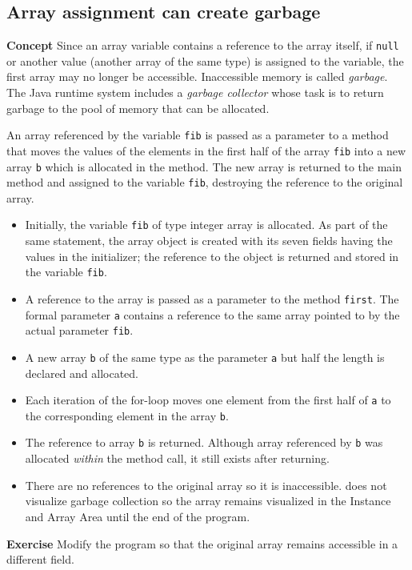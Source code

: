 \subsection{Array assignment can create garbage}\label{array.05}

\textbf{Concept} Since an array variable contains a reference to the array itself, if 
\texttt{null} or another value (another array of the same type) is assigned to the 
variable, the first array may no longer be accessible. Inaccessible memory 
is called \emph{garbage}. The Java runtime system includes a \emph{garbage 
collector} whose task is to return garbage to the pool of memory that can 
be allocated.


An array referenced by the variable \texttt{fib} is passed as a parameter to a method that moves the values of the elements in the first half of the array \texttt{fib} into a new array \texttt{b} which is allocated in the method. The new array is returned to the main method and assigned to the variable \texttt{fib}, destroying the reference to the original array.

\begin{itemize}
\item Initially, the variable \texttt{fib} of type integer array is allocated. As part of the same statement, the array object is created with its seven fields having the values in the initializer; the reference to the object is returned and stored in the variable \texttt{fib}.
\item A reference to the array is passed as a parameter to the method \texttt{first}. The formal parameter \texttt{a} contains a reference to the same array pointed to by the actual parameter \texttt{fib}.
\item A new array \texttt{b} of the same type as the parameter \texttt{a} but half the length is declared and allocated.
\item Each iteration of the for-loop moves one element from the first half of \texttt{a} to the corresponding element in the array \texttt{b}.
\item The reference to array \texttt{b} is returned. Although array referenced by \texttt{b} was allocated \emph{within} the method call, it still exists after returning. 
\item There are no references to the original array so it is inaccessible. \jel{} does not visualize garbage collection so the array remains visualized in the Instance and Array Area until the end of the program.
\end{itemize}

\textbf{Exercise} Modify the program so that the original array remains accessible
in a different field.
